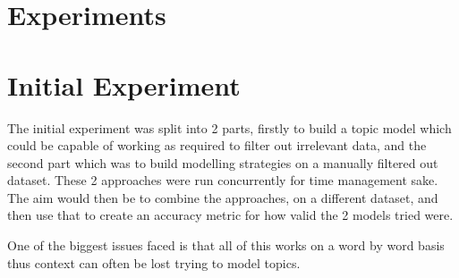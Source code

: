 \section{Experiments}

\section{Initial Experiment}
The initial experiment was split into 2 parts, firstly to build a topic model which could be capable of working as required to filter out irrelevant data, and the second part which was to build modelling strategies on a manually filtered out dataset. These 2 approaches were run concurrently for time management sake. The aim would then be to combine the approaches, on a different dataset, and then use that to create an accuracy metric for how valid the 2 models tried were.


One of the biggest issues faced is that all of this works on a word by word basis thus context can often be lost trying to model topics. 